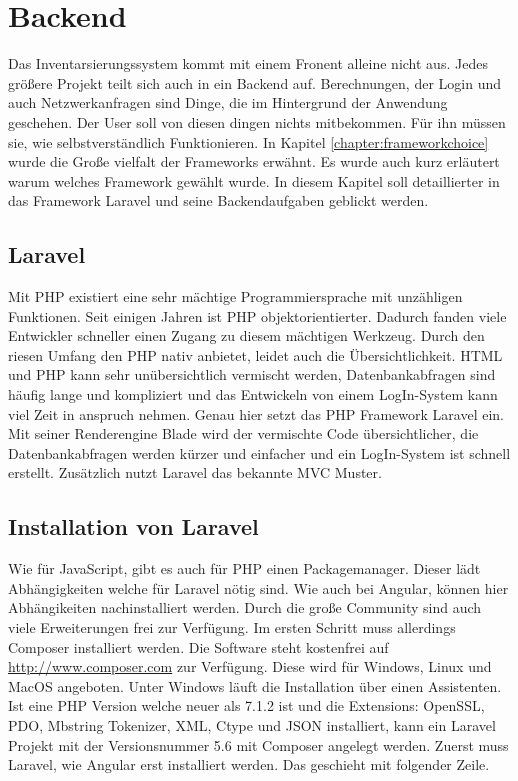 \section{Backend}
Das Inventarsierungssystem kommt mit einem Fronent alleine nicht aus. Jedes größere Projekt teilt sich auch in ein Backend auf. Berechnungen, der Login und auch Netzwerkanfragen sind Dinge, die im Hintergrund der Anwendung geschehen. Der User soll von diesen dingen nichts mitbekommen. Für ihn müssen sie, wie selbstverständlich Funktionieren. In Kapitel \ref{chapter:frameworkchoice} wurde die Große vielfalt der Frameworks erwähnt. Es wurde auch kurz erläutert warum welches Framework gewählt wurde. In diesem Kapitel soll detaillierter in das Framework Laravel und seine Backendaufgaben geblickt werden.

\subsection{Laravel}
Mit \ac{PHP} existiert eine sehr mächtige Programmiersprache mit unzähligen Funktionen. Seit einigen Jahren ist \ac{PHP} objektorientierter. Dadurch fanden viele Entwickler schneller einen Zugang zu diesem mächtigen Werkzeug. Durch den riesen Umfang den \ac{PHP} nativ anbietet, leidet auch die Übersichtlichkeit. \ac{HTML} und \ac{PHP} kann sehr unübersichtlich vermischt werden, Datenbankabfragen sind häufig lange und kompliziert und das Entwickeln von einem LogIn-System kann viel Zeit in anspruch nehmen. Genau hier setzt das \ac{PHP} Framework Laravel ein. Mit seiner Renderengine Blade wird der vermischte Code übersichtlicher, die Datenbankabfragen werden kürzer und einfacher und ein LogIn-System ist schnell erstellt. Zusätzlich nutzt Laravel das bekannte \ac{MVC} Muster.\autocite{Laravel.2018}

\subsection{Installation von Laravel}
Wie für JavaScript, gibt es auch für \ac{PHP} einen Packagemanager. Dieser lädt Abhängigkeiten welche für Laravel nötig sind. Wie auch bei Angular, können hier Abhängikeiten nachinstalliert werden. Durch die große Community sind auch viele Erweiterungen frei zur Verfügung. Im ersten Schritt muss allerdings Composer installiert werden. Die Software steht kostenfrei auf \url{http://www.composer.com} zur Verfügung. Diese wird für Windows, Linux und MacOS angeboten. \autocite{Composer.2018} Unter Windows läuft die Installation über einen Assistenten. Ist eine \ac{PHP} Version welche neuer als 7.1.2 ist und die Extensions: OpenSSL, \ac{PDO}, Mbstring Tokenizer, \ac{XML}, Ctype und \ac{JSON} installiert, kann ein Laravel Projekt mit der Versionsnummer 5.6  mit Composer angelegt werden. Zuerst muss Laravel, wie Angular erst installiert werden. Das geschieht mit folgender Zeile.

